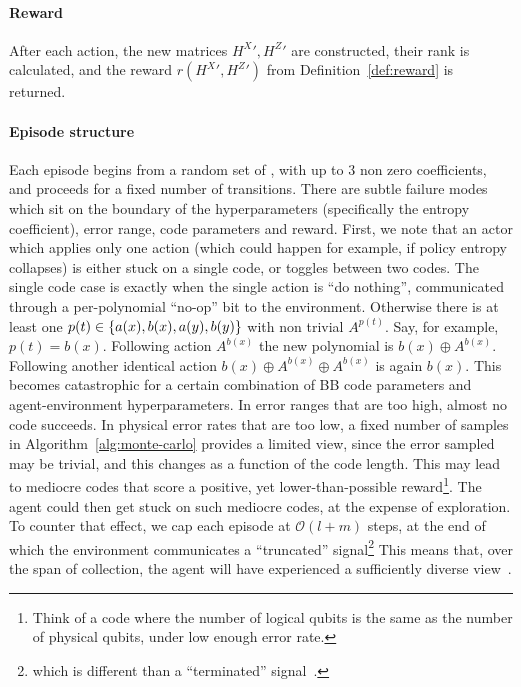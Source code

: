\paragraph{Reward} After each action, the new matrices \({H^{X}}', {H^{Z}}'\) are constructed, their rank is calculated, and 
the reward \(r({H^{X}}', {H^{Z}}')\) from Definition~\ref{def:reward} is returned.

\paragraph{Episode structure} Each episode begins from a random set of \polynomials{}, with up to \(3\) non zero coefficients, and proceeds for a fixed number of transitions. There are subtle failure modes which sit on the boundary of the hyperparameters (specifically the entropy coefficient), error range, code parameters and reward. First, we note that an actor which applies only one action (which could happen for example, if policy entropy collapses) is either stuck on a single code, or toggles between two codes. The single code case is exactly when the single action is ``do nothing'', communicated through a per-polynomial ``no-op'' bit to the environment. Otherwise there is at least one \(p(t)\in \{a(x), b(x), a(y), b(y)\}\) with non trivial \(A^{p(t)}\). Say, for example, \(p(t) = b(x)\). Following action \(A^{b(x)}\) the new polynomial is \(b(x)\oplus A^{b(x)}\). Following another identical action \(b(x)\oplus A^{b(x)}\oplus A^{b(x)}\) is again \(b(x)\). 
This becomes catastrophic for a certain combination of BB code parameters and agent-environment hyperparameters. In error ranges that are too high, almost no code succeeds. In physical error rates that are too low, a fixed number of samples in Algorithm~\ref{alg:monte-carlo} provides a limited view, since the error sampled may be trivial, and this changes as a function of the code length. This may lead to mediocre codes that score a positive, yet lower-than-possible reward\footnote{Think of a code where the number of logical qubits is the same as the number of physical qubits, under low enough error rate.}. The agent could then get stuck on such mediocre codes, at the expense of exploration. To counter that effect, we cap each episode at \(\mathcal{O}(l+m)\) steps, at the end of which the environment communicates a ``truncated'' signal\footnote{which is different than a ``terminated'' signal~\cite{towers2024gymnasium}.} This means that, over the span of collection, the agent will have experienced a sufficiently diverse view~\cite{sutton2018reinforcement}.

